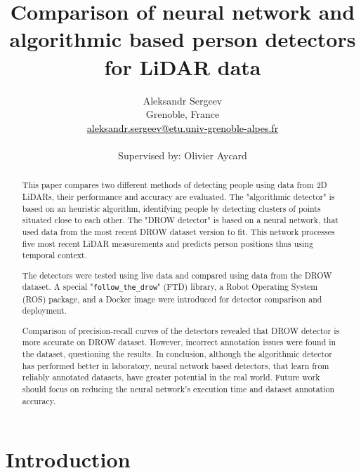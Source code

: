 \documentclass{article}
\title{
    Comparison of neural network and algorithmic based person detectors for LiDAR data
}
\author{
    Aleksandr Sergeev \\ 
    Grenoble, France \\
    \href{mailto:aleksandr.sergeev@etu.univ-grenoble-alpes.fr}{\textcolor{black}{aleksandr.sergeev@etu.univ-grenoble-alpes.fr}} \\
    \\
    Supervised by: Olivier Aycard
}
\begin{document}

\parbox[b]{\linewidth}{}

\begin{abstract}
    This paper compares two different methods of detecting people using data from 2D LiDARs, their performance and accuracy are evaluated.
    The "algorithmic detector" is based on an heuristic algorithm, identifying people by detecting clusters of points situated close to each other.
    The "DROW detector" is based on a neural network, that used data from the most recent DROW dataset version to fit.
    This network processes five most recent LiDAR measurements and predicts person positions thus using temporal context.

    The detectors were tested using live data and compared using data from the DROW dataset.
    A special "\texttt{follow\_the\_drow}" (FTD) library, a Robot Operating System (ROS) package, and a Docker image were introduced for detector comparison and deployment.

    Comparison of precision-recall curves of the detectors revealed that DROW detector is more accurate on DROW dataset.
    However, incorrect annotation issues were found in the dataset, questioning the results.
    In conclusion, although the algorithmic detector has performed better in laboratory, neural network based detectors, that learn from reliably annotated datasets, have greater potential in the real world.
    Future work should focus on reducing the neural network's execution time and dataset annotation accuracy.
\end{abstract}

\section{Introduction}
\end{document}
